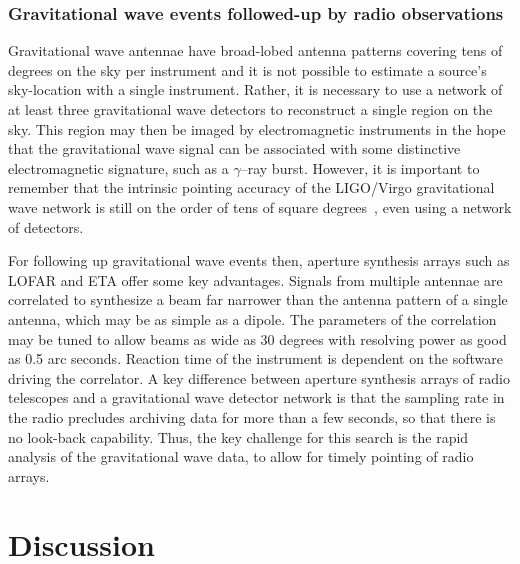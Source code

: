 \subsubsection{Gravitational wave events followed-up by radio observations}

Gravitational wave antennae have broad-lobed antenna patterns covering
tens of degrees on the sky per instrument and it is not possible to estimate
a source's sky-location with a single instrument.  Rather, it is necessary
to use a network of at least three gravitational wave detectors to reconstruct
a single region on the sky.  This region may then be imaged by electromagnetic
instruments in the hope that the gravitational wave signal can be associated
with some distinctive electromagnetic signature, such as a $\gamma$--ray
burst.  However, it is important to remember that the intrinsic pointing
accuracy of the LIGO/Virgo gravitational wave network is still on the order of
tens of square degrees~\cite{Fairhurst:2009tc}, even using a network of
detectors.  


For following up gravitational wave events then, aperture synthesis arrays such
as LOFAR and ETA offer some key advantages.  Signals from multiple antennae are
correlated to synthesize a beam far narrower than the antenna pattern of a
single antenna, which may be as simple as a dipole.  The parameters of the
correlation may be tuned to allow beams as wide as 30 degrees with resolving
power as good as 0.5 arc seconds. Reaction time of the instrument is dependent
on the software driving the correlator. A key difference between aperture
synthesis arrays of radio telescopes and a gravitational wave detector network
is that the sampling rate in the radio precludes archiving data for more than a
few seconds, so that there is no look-back capability.  Thus, the key challenge
for this search is the rapid analysis of the gravitational wave data, to allow
for timely pointing of radio arrays.

\section{Discussion}

